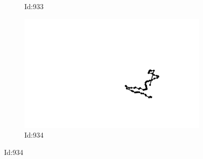 \documentclass[12pt,twoside]{report}
\begin{document}
\begin{figure}
\begin{subfigure}[b]{0.20\textwidth}
\caption{Id:933}
\end{subfigure}
\begin{subfigure}[b]{0.20\textwidth}
\centering
\includegraphics[width=\textwidth]{../trajectories/934.png}
\caption{Id:934}
\end{subfigure}
\end{figure}
\end{document}
